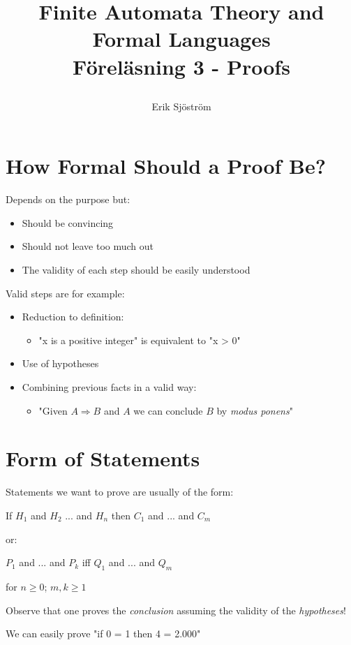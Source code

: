 
\usepackage{color}
\usepackage{bussproofs}
\usepackage{listings}
\lstset{language=Haskell,
        mathescape}
\title{
	 Finite Automata Theory and Formal Languages\\
	 Föreläsning 3 - Proofs
    \author{Erik Sjöström}
}

\maketitle

\section{How Formal Should a Proof Be?} %
\label{sec:how_formal_should_a_proof_be_}
Depends on the purpose but:
\begin{itemize}
    \item Should be convincing
    \item Should not leave too much out
    \item The validity of each step should be easily understood
\end{itemize}
Valid steps are for example:
\begin{itemize}
    \item Reduction to definition:
    \begin{itemize}
        \item "x is a positive integer" is equivalent to "x > 0"
    \end{itemize}
    \item Use of hypotheses
    \item Combining previous facts in a valid way:
    \begin{itemize}
        \item "Given $A \Rightarrow B$ and $A$ we can conclude $B$ by \textit{modus ponens}"
    \end{itemize}
\end{itemize}

\section{Form of Statements} %
\label{sec:form_of_statements}
Statements we want to prove are usually of the form:
\begin{center}
    If $H_1$ and $H_2$ ... and $H_n$ then $C_1$ and ... and $C_m$
\end{center}
or:
\begin{center}
    $P_1$ and ... and $P_k$ iff $Q_1$ and ... and $Q_m$
\end{center}
for $n \ge 0$; $m,k \ge 1$
\begin{Rem}
    Observe that one proves the \emph{conclusion} assuming the validity of the \emph{hypotheses}!
\end{Rem}
\begin{Ex}
    We can easily prove "if 0 = 1 then 4 = 2.000"
\end{Ex}

